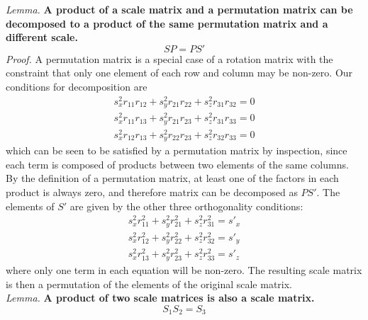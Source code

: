 \documentclass{article}
\begin{document}
\noindent
\textit{Lemma.}\textbf{ A product of a scale matrix and a permutation matrix can be decomposed to a product of the same permutation matrix and a different scale.}
\begin{equation}
SP = PS'
\end{equation}
\noindent\textit{Proof.}
A permutation matrix is a special case of a rotation matrix with the constraint that only one element of each row and column may be non-zero. Our conditions for decomposition are
\begin{align}
{s_x^2 r_{11}r_{12} + s_y^2 r_{21}r_{22} + s_z^2 r_{31}r_{32}} = 0\\
{s_x^2 r_{11}r_{13} + s_y^2 r_{21}r_{23} + s_z^2 r_{31}r_{33}} = 0\\
{s_x^2 r_{12}r_{13} + s_y^2 r_{22}r_{23} + s_z^2 r_{32}r_{33}} = 0
\end{align}
which can be seen to be satisfied by a permutation matrix by inspection, since each term is composed of products between two elements of the same columns. By the definition of a permutation matrix, at least one of the factors in each product is always zero, and therefore matrix can be decomposed as $PS'$. The elements of $S'$ are given by the other three orthogonality conditions:
\begin{align}
{s_x^2 r_{11}^2 + s_y^2 r_{21}^2 + s_z^2 r_{31}^2} = s'_x\\
{s_x^2 r_{12}^2 + s_y^2 r_{22}^2 + s_z^2 r_{32}^2} = s'_y\\
{s_x^2 r_{13}^2 + s_y^2 r_{23}^2 + s_z^2 r_{33}^2} = s'_z
\end{align}
where only one term in each equation will be non-zero. The resulting scale matrix is then a permutation of the elements of the original scale matrix.\\

\noindent
\textit{Lemma.}\textbf{ A product of two scale matrices is also a scale matrix.}
\begin{equation}
S_1 S_2 = S_3
\end{equation}
\end{document}
